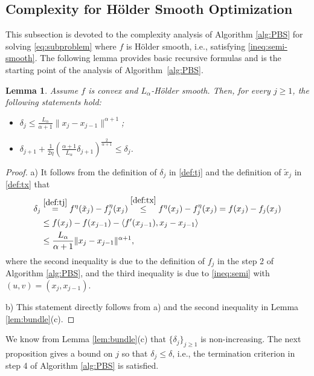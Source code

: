 \documentclass[11pt,letterpaper]{article}
\newcommand{\chen}{\color{cyan}}
\newtheorem{lemma}[thm]{Lemma}
\newcommand{\inner}[2]{\langle #1,#2\rangle}
\newcommand{\tx}{\tilde x}
\begin{document}
\subsection{Complexity for Hölder Smooth Optimization}\label{subsec:bundle}

This subsection is devoted to the complexity analysis of Algorithm \ref{alg:PBS} for solving \eqref{eq:subproblem} where $f$ is Hölder smooth, i.e., satisfying \eqref{ineq:semi-smooth}.
The following lemma provides basic recursive formulas and is the starting point of the analysis of Algorithm~\ref{alg:PBS}.


\begin{lemma}\label{lem:tj}
Assume $f$ is convex and $L_\alpha$-Hölder smooth.
Then, for every $j\ge 1$, the following statements hold:
\begin{itemize}
    \item[a)] $\delta_j \le \frac {L_\alpha}{\alpha+1} \|x_j-x_{j-1}\|^{\alpha+1}$; %
    \item[b)] $\delta_{j+1} + \frac{1}{2\eta} \left(\frac{\alpha+1}{L_\alpha} \delta_{j+1}\right)^{\frac{2}{\alpha+1}} \le \delta_j$.
\end{itemize}
\end{lemma}

\begin{proof}
a) It follows from the definition of $\delta_j$ in \eqref{def:tj} and the definition of $\tx_j$ in \eqref{def:tx} that
\begin{align*}
    \delta_j & \stackrel{\eqref{def:tj}}=f^\eta(\tx_j) - f_j^\eta(x_j) \stackrel{\eqref{def:tx}} \le f^\eta(x_j) - f_j^\eta(x_j) = f(x_j)-f_j(x_j) \\
    &\le f(x_j) - f(x_{j-1}) - \inner{f'(x_{j-1})}{x_j-x_{j-1}} \\
    &\le \frac{L_\alpha}{\alpha+1} \|x_j-x_{j-1}\|^{\alpha+1},
\end{align*}
where the second inequality is due to the definition of $f_j$ in the step 2 of Algorithm \ref{alg:PBS}, and the third inequality is due to \eqref{ineq:semi} with $(u,v)=(x_j,x_{j-1})$.

b) This statement directly follows from a) and the second inequality in Lemma \ref{lem:bundle}(c).
\end{proof}


We know from Lemma \ref{lem:bundle}(c) that $\{\delta_j\}_{j\ge1}$ is non-increasing.
The next proposition gives a bound on $j$ so that $\delta_j\le \delta$, i.e., the termination criterion in step 4 of Algorithm \ref{alg:PBS} is satisfied.
\end{document}
